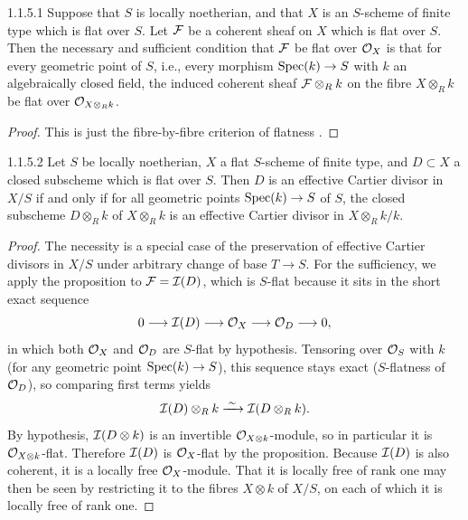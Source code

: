 \begin{customprop}{1.1.5.1}\label{prop:1.1.5.1}
Suppose that $S$ is locally noetherian, and that $X$ is an $S$-scheme of finite type which is flat over $S$. Let $\mathcal{F}$ be a coherent sheaf on $X$ which is flat over $S$. Then the necessary and sufficient condition that $\mathcal{F}$ be flat over $\mathcal{O}_X$ is that for every geometric point of $S$, i.e., every morphism $\operatorname{Spec}(k) \to S$ with $k$ an algebraically closed field, the induced coherent sheaf $\mathcal{F} \otimes_R k$ on the fibre $X \otimes_R k$ be flat over $\mathcal{O}_{X \otimes_R k}$.
\end{customprop}

\begin{proof}
This is just the fibre-by-fibre criterion of flatness \cite[V, 3.6]{AK1}.
\end{proof}

\begin{customcor}{1.1.5.2}\label{cor:1.1.5.2}
Let $S$ be locally noetherian, $X$ a flat $S$-scheme of finite type, and $D \subset X$ a closed subscheme which is flat over $S$. Then $D$ is an effective Cartier divisor in $X/S$ if and only if for all geometric points $\operatorname{Spec}(k) \to S$ of $S$, the closed subscheme $D \otimes_R k$ of $X \otimes_R k$ is an effective Cartier divisor in $X \otimes_R k / k$.
\end{customcor}

\begin{proof}
The necessity is a special case of the preservation of effective Cartier divisors in $X/S$ under arbitrary change of base $T \to S$. For the sufficiency, we apply the proposition to $\mathcal{F} = \mathcal{I}(D)$, which is $S$-flat because it sits in the short exact sequence
\[
0 \longrightarrow \mathcal{I}(D) \longrightarrow \mathcal{O}_X \longrightarrow \mathcal{O}_D \longrightarrow 0,
\]
in which both $\mathcal{O}_X$ and $\mathcal{O}_D$ are $S$-flat by hypothesis. Tensoring over $\mathcal{O}_S$ with $k$ (for any geometric point $\operatorname{Spec}(k) \to S$), this sequence stays exact ($S$-flatness of $\mathcal{O}_D$), so comparing first terms yields
\[
\mathcal{I}(D) \otimes_R k \xrightarrow{\;\sim\;} \mathcal{I}(D \otimes_R k).
\]
By hypothesis, $\mathcal{I}(D \otimes k)$ is an invertible $\mathcal{O}_{X \otimes k}$-module, so in particular it is $\mathcal{O}_{X \otimes k}$-flat. Therefore $\mathcal{I}(D)$ is $\mathcal{O}_X$-flat by the proposition. Because $\mathcal{I}(D)$ is also coherent, it is a locally free $\mathcal{O}_X$-module. That it is locally free of rank one may then be seen by restricting it to the fibres $X \otimes k$ of $X/S$, on each of which it is locally free of rank one.
\end{proof}

